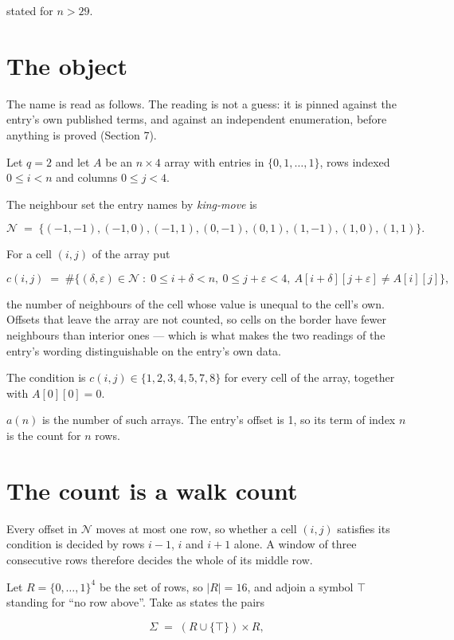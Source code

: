 \documentclass[11pt]{article}
\theoremstyle{definition}
\begin{document}
stated for $n > 29$.

\section{The object}

The name is read as follows. The reading is not a guess: it is pinned against the entry's own published terms, and against an independent enumeration, before anything is proved (Section 7).

Let $q = 2$ and let $A$ be an $n \times 4$ array with entries in $\{0,1,\dots,1\}$, rows indexed $0 \le i < n$ and columns $0 \le j < 4$.

The neighbour set the entry names by {\itshape king-move} is

\[\mathcal{N} \;=\; \{(-1,-1), (-1,0), (-1,1), (0,-1), (0,1), (1,-1), (1,0), (1,1)\}.\]

For a cell $(i,j)$ of the array put

\[c(i,j) \;=\; \#\bigl\{(\delta,\varepsilon)\in\mathcal{N} \;:\; 0\le i+\delta<n,\ 0\le j+\varepsilon<4,\ A[i+\delta][j+\varepsilon] \neq A[i][j]\bigr\},\]

the number of neighbours of the cell whose value is unequal to the cell's own. Offsets that leave the array are not counted, so cells on the border have fewer neighbours than interior ones --- which is what makes the two readings of the entry's wording distinguishable on the entry's own data.

The condition is $c(i,j) \in \{1, 2, 3, 4, 5, 7, 8\}$ for every cell of the array, together with $A[0][0]=0$.

$a(n)$ is the number of such arrays. The entry's offset is 1, so its term of index $n$ is the count for $n$ rows.

\section{The count is a walk count}

Every offset in $\mathcal{N}$ moves at most one row, so whether a cell $(i,j)$ satisfies its condition is decided by rows $i-1$, $i$ and $i+1$ alone. A window of three consecutive rows therefore decides the whole of its middle row.

Let $R = \{0,\dots,1\}^{4}$ be the set of rows, so $|R| = 16$, and adjoin a symbol $\top$ standing for ``no row above''. Take as states the pairs

\[\Sigma \;=\; (R \cup \{\top\}) \times R,\]
\end{document}
